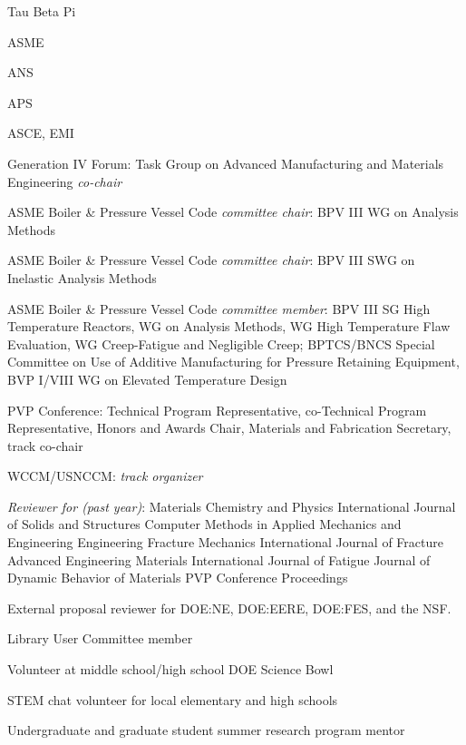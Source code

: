Tau Beta Pi 


ASME 

ANS 

APS 

ASCE, EMI 


Generation IV Forum:  Task Group on Advanced Manufacturing and Materials Engineering \emph{co-chair} 

ASME Boiler \& Pressure Vessel Code \emph{committee chair}:  BPV III WG on Analysis Methods

ASME Boiler \& Pressure Vessel Code \emph{committee chair}:  BPV III SWG on Inelastic Analysis Methods 

ASME Boiler \& Pressure Vessel Code \emph{committee member}:  BPV III SG High Temperature Reactors,
WG on Analysis Methods, WG High Temperature Flaw Evaluation, 
WG Creep-Fatigue and Negligible Creep; BPTCS/BNCS Special Committee on 
Use of Additive Manufacturing for Pressure Retaining Equipment, BVP I/VIII WG on Elevated Temperature Design

PVP Conference:  Technical Program Representative, co-Technical Program Representative, Honors and Awards Chair, Materials and Fabrication Secretary, track co-chair

WCCM/USNCCM:  \emph{track organizer} 

\emph{Reviewer for (past year)}:   
Materials Chemistry and Physics
International Journal of Solids and Structures
Computer Methods in Applied Mechanics and Engineering
Engineering Fracture Mechanics
International Journal of Fracture
Advanced Engineering Materials
International Journal of Fatigue
Journal of Dynamic Behavior of Materials
PVP Conference Proceedings

External proposal reviewer for DOE:NE, DOE:EERE, DOE:FES, and the NSF. 


Library User Committee member 

Volunteer at middle school/high school DOE Science Bowl 

STEM chat volunteer for local elementary and high schools 

Undergraduate and graduate student summer research program mentor 

